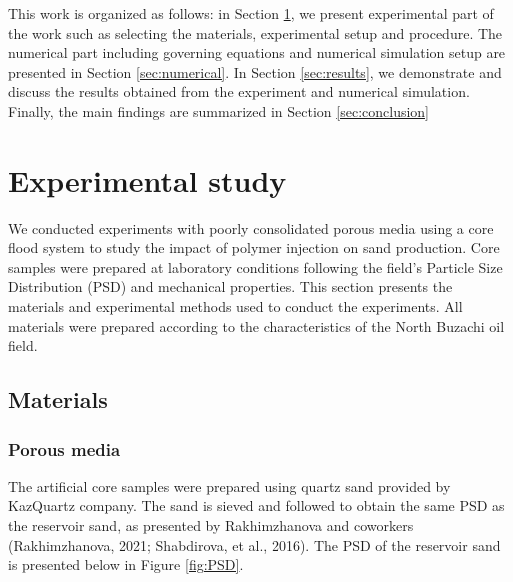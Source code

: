 \documentclass{article}
\begin{document}
{This work is organized as follows: in Section \ref{sec:exp}, we present experimental part of the work such as selecting the materials, experimental setup and procedure. The numerical part including governing equations and numerical simulation setup are presented in Section \ref{sec:numerical}. In Section \ref{sec:results}, we demonstrate and discuss the results obtained from the experiment and numerical simulation. Finally, the main findings are summarized in Section \ref{sec:conclusion}







\section{Experimental study}
\label{sec:exp}
We conducted experiments with poorly consolidated porous media using a core flood system to study the impact of polymer injection on sand production. Core samples were prepared at laboratory conditions following the field's Particle Size Distribution (PSD) and mechanical properties. This section presents the materials and experimental methods used to conduct the experiments. All materials were prepared according to the characteristics of the North Buzachi oil field. 


\subsection{Materials}



\subsubsection{Porous media}
The artificial core samples were prepared using quartz sand provided by KazQuartz company. The sand is sieved and followed to obtain the same PSD as the reservoir sand, as presented by Rakhimzhanova and coworkers (Rakhimzhanova, 2021; Shabdirova, et al., 2016). The PSD of the reservoir sand is presented below in Figure \ref{fig:PSD}. 

}
\end{document}
